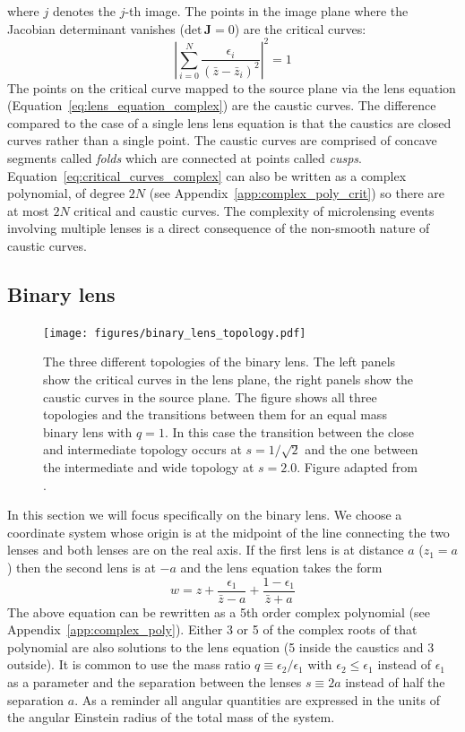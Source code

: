 \documentclass[12pt,dvipsnames]{report}
\begin{document}
where $j$ denotes the $j$-th image. The points in the image plane where the Jacobian determinant vanishes
($\mathrm{det}\,\mathbf J=0$) are the critical curves:
\begin{equation}
    \left|\sum_{i=0}^{N} \frac{\epsilon_{i}}{\left(\bar{z}-\bar{z}_i\right)^{2}}\right|^{2}=1
    \label{eq:critical_curves_complex}
\end{equation}
The points on the critical curve mapped to the source plane via
the lens equation (Equation~\ref{eq:lens_equation_complex}) are the caustic curves.
The difference compared to the case of a single lens lens equation is that the caustics are closed curves
rather than a single point. The caustic curves are comprised of concave segments called \emph{folds} which are connected
at points called \emph{cusps}.
Equation~\ref{eq:critical_curves_complex} can also be written as a complex polynomial, of
degree $2N$ (see Appendix~\ref{app:complex_poly_crit}) so there are at most $2N$ critical and caustic curves.
The complexity of microlensing events involving multiple lenses is a direct consequence of the
non-smooth nature of caustic curves.

\subsection{Binary lens}
\begin{figure}[ht!]
    \centering
    \texttt{[image: figures/binary\_lens\_topology.pdf]}
    \caption{The three different topologies of the binary lens. The left panels show the
        critical curves in the lens plane, the right panels show the caustic curves in the
        source plane. The figure shows all three topologies and the transitions between
        them for an equal mass binary lens with $q=1$. In this case the transition between
        the close and intermediate topology occurs at $s=1/\sqrt{2}$ and the one between
        the intermediate and wide topology at $s=2.0$. Figure adapted from
        \citet{dominik1999}.
    }
    \label{fig:binary_lens_topology}
\end{figure}
In this section we will focus specifically on the binary lens. We choose a
coordinate system whose origin is at the midpoint of the line connecting the
two lenses and both lenses are on the real axis. If the first lens is at
distance $a$ ($z_1=a$) then the second lens is at $-a$ and the lens equation
takes the form
\begin{equation}
    w=z+\frac{\epsilon_{1}}{\bar{z} - a}+\frac{1 - \epsilon_{1}}{\bar{z} + a}
\end{equation}
The above equation can be rewritten as a 5th order complex polynomial
(see Appendix~\ref{app:complex_poly}). Either 3 or 5 of the complex roots of that
polynomial are also solutions to the lens equation
(5 inside the caustics and 3 outside).
It is common to use the mass ratio $q\equiv \epsilon_2/\epsilon_1$ with
$\epsilon_2 \leq \epsilon_1$ instead  of $\epsilon_1$ as a parameter and the
separation between the lenses $s\equiv 2a$ instead of half the separation $a$.
As a reminder all angular quantities are expressed in the units of the angular Einstein
radius of the total mass of the system.
\end{document}
